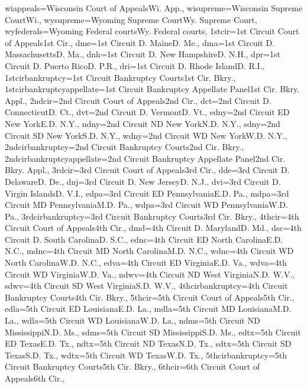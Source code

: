 {wiappeals={{Wisconsin Court of Appeals}{Wi.  App.}},
wisupreme={{Wisconsin Supreme Court}{Wi.}},
wysupreme={{Wyoming Supreme Court}{Wy. Supreme Court}},
wyfederals={{Wyoming Federal courts}{Wy. Federal courts}},
1stcir={{1st Circuit Court of Appeals}{1st Cir.}},
dme={{1st Circuit D. Maine}{D. Me.}},
dma={{1st Circuit D. Massachusetts}{D. Ma.}},
dnh={{1st Circuit D. New Hampshire}{D. N.H.}},
dpr={{1st Circuit D. Puerto Rico}{D. P.R.}},
dri={{1st Circuit D. Rhode Island}{D. R.I.}},
1stcirbankruptcy={{1st Circuit Bankruptcy Courts}{1st Cir. Bkry.}},
1stcirbankruptcyappellate={{1st Circuit Bankruptcy Appellate Panel}{1st Cir. Bkry. Appl.}},
2ndcir={{2nd Circuit Court of Appeals}{2nd Cir.}},
dct={{2nd Circuit D. Connecticut}{D. Ct.}},
dvt={{2nd Circuit D. Vermont}{D. Vt.}},
edny={{2nd Circuit ED New York}{E.D. N.Y.}},
ndny={{2nd Circuit ND New York}{N.D. N.Y.}},
sdny={{2nd Circuit SD New York}{S.D. N.Y.}},
wdny={{2nd Circuit WD New York}{W.D. N.Y.}},
2ndcirbankruptcy={{2nd Circuit Bankruptcy Courts}{2nd Cir. Bkry.}},
2ndcirbankruptcyappellate={{2nd Circuit Bankruptcy Appellate Panel}{2nd Cir. Bkry. Appl.}},
3rdcir={{3rd Circuit Court of Appeals}{3rd Cir.}},
dde={{3rd Circuit D. Delaware}{D. De.}},
dnj={{3rd Circuit D. New Jersey}{D. N.J.}},
dvi={{3rd Circuit D. Virgin Islands}{D. V.I.}},
edpa={{3rd Circuit ED Pennsylvania}{E.D. Pa.}},
mdpa={{3rd Circuit MD Pennsylvania}{M.D. Pa.}},
wdpa={{3rd Circuit WD Pennsylvania}{W.D. Pa.}},
3rdcirbankruptcy={{3rd Circuit Bankruptcy Courts}{3rd Cir. Bkry.}},
4thcir={{4th Circuit Court of Appeals}{4th Cir.}},
dmd={{4th Circuit D. Maryland}{D. Md.}},
dsc={{4th Circuit D. South Carolina}{D. S.C.}},
ednc={{4th Circuit ED North Carolina}{E.D. N.C.}},
mdnc={{4th Circuit MD North Carolina}{M.D. N.C.}},
wdnc={{4th Circuit WD North Carolina}{W.D. N.C.}},
edva={{4th Circuit ED Virginia}{E.D. Va.}},
wdva={{4th Circuit WD Virginia}{W.D. Va.}},
ndwv={{4th Circuit ND West Virginia}{N.D. W.V.}},
sdwv={{4th Circuit SD West Virginia}{S.D. W.V.}},
4thcirbankruptcy={{4th Circuit Bankruptcy Courts}{4th Cir. Bkry.}},
5thcir={{5th Circuit Court of Appeals}{5th Cir.}},
edla={{5th Circuit ED Louisiana}{E.D. La.}},
mdla={{5th Circuit MD Louisiana}{M.D. La.}},
wdla={{5th Circuit WD Louisiana}{W.D. La.}},
ndms={{5th Circuit ND Mississippi}{N.D. Ms.}},
sdms={{5th Circuit SD Mississippi}{S.D. Ms.}},
edtx={{5th Circuit ED Texas}{E.D. Tx.}},
ndtx={{5th Circuit ND Texas}{N.D. Tx.}},
sdtx={{5th Circuit SD Texas}{S.D. Tx.}},
wdtx={{5th Circuit WD Texas}{W.D. Tx.}},
5thcirbankruptcy={{5th Circuit Bankruptcy Courts}{5th Cir. Bkry.}},
6thcir={{6th Circuit Court of Appeals}{6th Cir.}},
}
